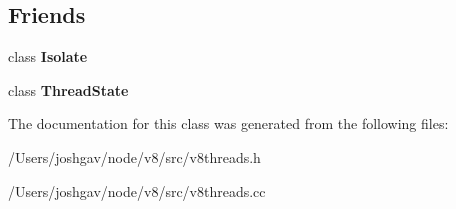 \subsection*{Friends}
\begin{DoxyCompactItemize}
\item 
class {\bfseries Isolate}\hypertarget{classv8_1_1internal_1_1_thread_manager_aba4f0964bdacf2bbf62cf876e5d28d0a}{}\label{classv8_1_1internal_1_1_thread_manager_aba4f0964bdacf2bbf62cf876e5d28d0a}

\item 
class {\bfseries Thread\+State}\hypertarget{classv8_1_1internal_1_1_thread_manager_aa9bf73e11f97e69db675bb6d4c212a2a}{}\label{classv8_1_1internal_1_1_thread_manager_aa9bf73e11f97e69db675bb6d4c212a2a}

\end{DoxyCompactItemize}


The documentation for this class was generated from the following files\+:\begin{DoxyCompactItemize}
\item 
/\+Users/joshgav/node/v8/src/v8threads.\+h\item 
/\+Users/joshgav/node/v8/src/v8threads.\+cc\end{DoxyCompactItemize}
